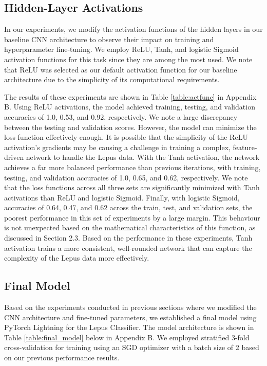 \documentclass{article}
\begin{document}
\subsection{Hidden-Layer Activations}
In our experiments, we modify the activation functions of the hidden layers in our baseline CNN architecture to observe their impact on training and hyperparameter fine-tuning. We employ ReLU, Tanh, and logistic Sigmoid activation functions for this task since they are among the most used. We note that ReLU was selected as our default activation function for our baseline architecture due to the simplicity of its computational requirements.

The results of these experiments are shown in Table \ref{table:actfunc} in Appendix B. Using ReLU activations, the model achieved training, testing, and validation accuracies of 1.0, 0.53, and 0.92, respectively. We note a large discrepancy between the testing and validation scores. However, the model can minimize the loss function effectively enough. It is possible that the simplicity of the ReLU activation’s gradients may be causing a challenge in training a complex, feature-driven network to handle the Lepus data. With the Tanh activation, the network achieves a far more balanced performance than previous iterations, with training, testing, and validation accuracies of 1.0, 0.65, and 0.62, respectively. We note that the loss functions across all three sets are significantly minimized with Tanh activations than ReLU and logistic Sigmoid. Finally, with logistic Sigmoid, accuracies of 0.64, 0.47, and 0.62 across the train, test, and validation sets, the poorest performance in this set of experiments by a large margin. This behaviour is not unexpected based on the mathematical characteristics of this function, as discussed in Section 2.3. Based on the performance in these experiments, Tanh activation trains a more consistent, well-rounded network that can capture the complexity of the Lepus data more effectively.

\subsection{Final Model}

Based on the experiments conducted in previous sections where we modified the CNN architecture and fine-tuned parameters, we established a final model using PyTorch Lightning \cite{pytorch-lightning} for the Lepus Classifier. The model architecture is shown in Table \ref{table:final_model} below in Appendix B. We employed stratified 3-fold cross-validation for training using an SGD optimizer with a batch size of 2 based on our previous performance results. 
\end{document}
